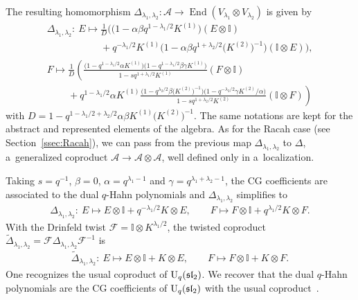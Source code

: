 \documentclass[10pt,a4paper]{amsart}
\numberwithin{equation}{section}
\theoremstyle{definition}
\begin{document}
The resulting homomorphism $\Delta_{\lambda_1,\lambda_2}\colon \mathcal{A} \to \operatorname{End}(V_{\lambda_1}\otimes V_{\lambda_2})$ is given by
\begin{gather*}
 \Delta_{\lambda_1,\lambda_2}\colon\ E\mapsto \frac{1}{D}\bigl(\bigl(1-\alpha\beta q^{1-\lambda_1/2}K^{(1)}\bigr)(E\otimes \mathbb{I})\\
 \phantom{ \Delta_{\lambda_1,\lambda_2}\colon\ E\mapsto }{}+q^{-\lambda_1/2}K^{(1)}\bigl(1-\alpha\beta q^{1+\lambda_2/2} \bigl(K^{(2)}\bigr)^{-1}\bigr)(\mathbb{I}\otimes E)\bigr),\\
 F\mapsto\frac{1}{D}\left(\frac{\bigl(1-q^{1-\lambda_1/2}\alpha K^{(1)}\bigr)\bigl(1-q^{1-\lambda_1/2}\beta\gamma K^{(1)}\bigr)}{1-sq^{1+\lambda_1/2} K^{(1)}}(F\otimes \mathbb{I})\right.\\
\left.\phantom{F\mapsto}{}+q^{1-\lambda_1/2}\alpha K^{(1)}
 \frac{\bigl(1-q^{\lambda_2/2}\beta \bigl(K^{(2)}\bigr)^{-1}\bigr)\bigl(1- q^{-\lambda_2/2}\gamma K^{(2)}/\alpha\bigr)}{1-sq^{1+\lambda_2/2} K^{(2)}}(\mathbb{I}\otimes F)\right)
\end{gather*}
with $D=1-q^{1-\lambda_1/2+\lambda_2/2}\alpha\beta K^{(1)}\bigl(K^{(2)}\bigr)^{-1}$.
The same notations are kept for the abstract and represented elements of the algebra. As for the Racah case (see Section~\ref{ssec:Racah}), we can pass from the previous map $\Delta_{\lambda_1,\lambda_2}$ to $\Delta$, a~generalized coproduct $\mathcal{A}\to \mathcal{A}\otimes\mathcal{A}$, well defined only in a~localization.


Taking $s=q^{-1}$, $\beta=0$, $\alpha=q^{\lambda_1-1}$ and $\gamma=q^{\lambda_1+\lambda_2-1}$, the CG coefficients are associated to the dual $q$-Hahn polynomials and $\Delta_{\lambda_1,\lambda_2}$ simplifies to
\begin{gather*}
 \Delta_{\lambda_1,\lambda_2}\colon\ E\mapsto E\otimes \mathbb{I} +q^{-\lambda_1/2} K\otimes E,\qquad
  F\mapsto F\otimes \mathbb{I} +q^{\lambda_1/2} K\otimes F.
\end{gather*}
With the Drinfeld twist $\mathscr{F}=\mathbb{I} \otimes K^{\lambda_1/2}$, the twisted coproduct $\widetilde{\Delta}_{\lambda_1,\lambda_2}=\mathscr{F}\Delta_{\lambda_1,\lambda_2} \mathscr{F}^{-1}$ is
\begin{gather*}
 \widetilde{\Delta}_{\lambda_1,\lambda_2}\colon\ E\mapsto E\otimes \mathbb{I} + K\otimes E,\qquad
  F\mapsto F\otimes \mathbb{I} + K\otimes F.
\end{gather*}
One recognizes the usual coproduct of ${\rm U}_q(\mathfrak{sl}_2)$. We recover that the dual $q$-Hahn polynomials are the CG coefficients of ${\rm U}_q(\mathfrak{sl}_2)$ with the usual coproduct~\cite{Arv}.
\end{document}

